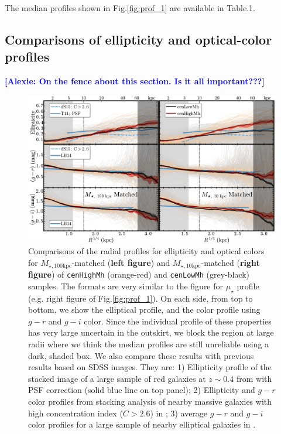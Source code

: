 \documentclass{emulateapj}
\def\rbcg{\texttt{cenHighMh}}
\def\nbcg{\texttt{cenLowMh}}
\def\minn{{$M_{\star,10\mathrm{kpc}}$}}
\def\mtot{{$M_{\star,100\mathrm{kpc}}$}}
\def\mden{{$\mu_{\star}$}}
\newcommand{\alexie}[1]{\textcolor{blue}{\textbf{[Alexie: #1]}}}
\newcommand{\update}[1]{\textcolor{Bittersweet}{#1}}
\begin{document}
\begin{CJK*}{UTF8}{gbsn}
    \update{
    The median profiles shown in Fig.\ref{fig:prof_1} are available in 
    Table.1.}


\subsection{Comparisons of ellipticity and optical-color profiles}
    \label{ssec:ell_color}
    
    \alexie{On the fence about this section. Is it all important???}
    
  \begin{figure}[t!]
      \centering 
      \includegraphics[width=\textwidth]{fig/redbcg_discussion_2}
      \caption{Comparisons of the radial profiles for ellipticity and optical colors 
      	for \mtot{}-matched (\textbf{left figure}) and \minn{}-matched 
      	(\textbf{right figure}) of \rbcg{} (orange-red) and \nbcg{} (grey-black) samples. 
        The formats are very similar to the figure for \mden{} profile 
        (e.g. right figure of Fig.\ref{fig:prof_1}). 
        On each side, from top to bottom, we show the elliptical profile, and the 
        color profile using $g-r$ and $g-i$ color. 
        Since the individual profile of these properties has very large uncertain in the 
        outskirt, we block the region at large radii where we think the median profiles 
        are still unreliable using a dark, shaded box.
        We also compare these results with previous results based on SDSS images. 
        They are: 
        1) Ellipticity profile of the stacked image of a large sample of red galaxies at 
        $z\sim 0.4$ from \citet{Tal2011} with PSF correction 
        (solid blue line on top panel); 
        2) Ellipticity and $g-r$ color profiles from stacking analysis of nearby massive 
        galaxies with high concentration index ($C>2.6$) in \citet[][blue dash lines 
        on the top and middle panels]{DSouza2014}; 
        3) average $g-r$ and $g-i$ color profiles for a large sample of nearby 
        elliptical galaxies in \citet[][blue, solid lines on the middle and bottom 
        panels]{LaBarbera2010}.}
      \label{fig:ell_color}
  \end{figure}
    

\end{CJK*}
\end{document}
